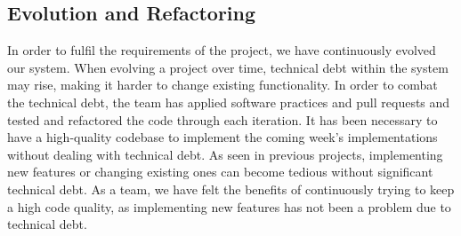 \subsection{Evolution and Refactoring}

In order to fulfil the requirements of the project, we have continuously evolved our system. When evolving a project over time, technical debt within the system may rise, making it harder to change existing functionality. In order to combat the technical debt, the team has applied software practices and pull requests and tested and refactored the code through each iteration. It has been necessary to have a high-quality codebase to implement the coming week's implementations without dealing with technical debt. As seen in previous projects, implementing new features or changing existing ones can become tedious without significant technical debt. As a team, we have felt the benefits of continuously trying to keep a high code quality, as implementing new features has not been a problem due to technical debt.